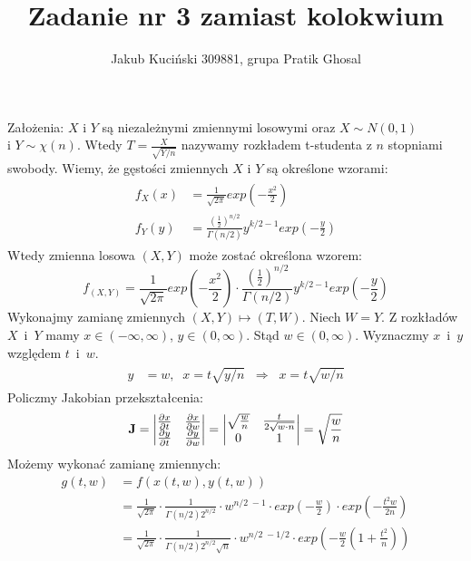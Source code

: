 \documentclass[a4paper,12pt] {article}
\title{Zadanie nr 3 zamiast kolokwium}
\author{Jakub Kuciński 309881, grupa Pratik Ghosal}
\begin{document}
\maketitle
\thispagestyle{empty}

Założenia: $X$ i $Y$ są niezależnymi zmiennymi losowymi oraz $X\sim N(0,1)$ \\ i $Y\sim\chi(n)$. Wtedy $T = \frac{X}{\sqrt{Y/n}}$ nazywamy rozkładem t-studenta z $n$ stopniami swobody. Wiemy, że gęstości zmiennych $X$ i $Y$ są określone wzorami: 
\begin{align}
\begin{split}
 f_X(x) &= \frac{1}{\sqrt{2\pi}}exp\left(-\frac{x^2}{2}\right) \\
 f_Y(y) &= \frac{(\frac{1}{2})^{n/2}}{\Gamma(n/2)}y^{k/2 - 1}exp\left(-\frac{y}{2}\right)
\end{split}
\end{align}
Wtedy zmienna losowa $(X,Y)$ może zostać określona wzorem:
\begin{equation}
f_{(X,Y)} = \frac{1}{\sqrt{2\pi}}exp\left(-\frac{x^2}{2}\right) \cdot \frac{(\frac{1}{2})^{n/2}}{\Gamma(n/2)}y^{k/2 - 1}exp\left(-\frac{y}{2}\right)
\end{equation}
Wykonajmy zamianę zmiennych $(X,Y) \mapsto (T, W)$. Niech $W = Y$. Z rozkładów $X$~i~$Y$ mamy $x \in (-\infty, \infty)$, $y \in (0, \infty)$. Stąd $w \in (0, \infty)$. Wyznaczmy $x$~i~$y$ względem $t$~i~$w$.
\begin{align}
\begin{split}
y &= w,\;\; x = t\sqrt{y/n} \;\;\Rightarrow \;\;x = t\sqrt{w/n}
\end{split}
\end{align}
Policzmy Jakobian przekształcenia:
$$
\mathbf{J} 
= 
\begin{vmatrix}
{\partial x \over \partial t} & {\partial x\over \partial w}  \\
{\partial y \over \partial t} & {\partial y\over \partial w}
\end{vmatrix}
=
\begin{vmatrix}
\sqrt{\frac{w}{n}} & \frac{t}{2\sqrt{w\cdot n}} \\
0 & 1 
\end{vmatrix}
=
\sqrt{\frac{w}{n}}
$$
Możemy wykonać zamianę zmiennych:
\begin{align}
g(t,w) &= f(x(t,w), y(t,w)) \\ 
	   &= \frac{1}{\sqrt{2 \pi}} \cdot \frac{1}{\Gamma (n/2) 2^{n/2}} \cdot w^{n/2 \;- 1} \cdot exp\left(-\frac{w}{2}\right) \cdot exp\left(-\frac{t^2w}{2n}\right) \\
	   &= \frac{1}{\sqrt{2 \pi}} \cdot \frac{1}{\Gamma (n/2) 2^{n/2} \sqrt{n}} \cdot  w^{n/2 \;- 1/2} \cdot exp\left(-\frac{w}{2}(1+\frac{t^2}{n})\right)
\end{align}
\end{document}
